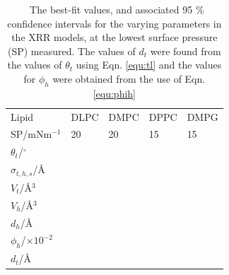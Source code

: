 \documentclass[11pt,a4paper]{paper}
\begin{document}
\begin{table}
  \centering
	\caption{\ The best-fit values, and associated 95 \% confidence intervals for the varying parameters in the XRR models, at the lowest surface pressure (SP) measured. The values of $d_t$ were found from the values of $\theta_t$ using Eqn. \ref{equ:tl} and the values for $\phi_h$ were obtained from the use of Eqn. \ref{equ:phih}}
	\label{tab:liptab3}
	\begin{tabular}{l|l|l|l|l}
		Lipid & DLPC & DMPC & DPPC & DMPG \\
    SP/mNm$^{-1}$ & 20 & 20 & 15 & 15 \\
		\hline
		$\theta_t$/$^\circ$ &  &  &  &  \\
		$\sigma_{t,h,s}$/\AA &  &  &  &  \\
    \hline
    $V_t$/\AA$^3$ &  &  &  &  \\
		$V_h$/\AA$^3$ &  &  &  &  \\
		$d_h$/\AA &  &  &  &  \\
    \hline
    $\phi_h$/$\times10^{-2}$ &  &  &  &  \\
		$d_t$/\AA &  &  &  &  \\
	\end{tabular}
\end{table}
%
\end{document}

